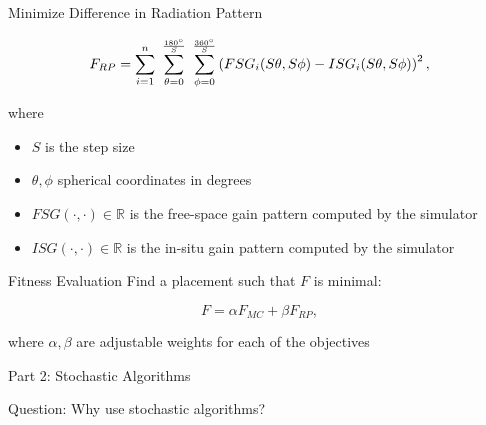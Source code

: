 \documentclass{beamer}
\begin{document}
\begin{frame}{Minimize Difference in Radiation Pattern}
    \begin{tcolorbox}[colback=green!5]
        \begin{equation} \label{eq:rp}
            F_{RP} = \sum_{i=1}^n~\sum_{\theta=0}^{\frac{180\degree}{S}}~\sum_{\phi=0}^{\frac{360\degree}{S}}
            \left( FSG_i(S\theta,S\phi) - ISG_i(S\theta,S\phi) \right) ^2,
        \end{equation}
    \end{tcolorbox}
    where
    \begin{itemize}
            \small
        \item $S$ is the step size
        \item $\theta, \phi$ spherical coordinates in degrees
        \item $FSG(\cdot,\cdot) \in \mathbb R$ is the free-space gain pattern computed by the simulator
        \item $ISG(\cdot,\cdot) \in \mathbb R$ is the in-situ gain pattern computed by the simulator
    \end{itemize}
\end{frame}

\begin{frame}{Fitness Evaluation}
    Find a placement such that $F$ is minimal:
    \begin{tcolorbox}[colback=green!5]
        \begin{equation} \label{eq:optimal}
            F = \alpha F_{MC} + \beta F_{RP},
        \end{equation}
    \end{tcolorbox}
    where $\alpha, \beta$ are adjustable weights for each of the objectives 
\end{frame}

\begin{frame}{\null}
    \begin{tcolorbox}[colback=green!5]
        \centering\Huge
        Part 2: Stochastic Algorithms
    \end{tcolorbox}
\end{frame}
\begin{frame}{\null}
    \begin{tcolorbox}[colback=green!5]
        \centering
        Question: Why use stochastic algorithms?
    \end{tcolorbox}
\end{frame}
\end{document}
